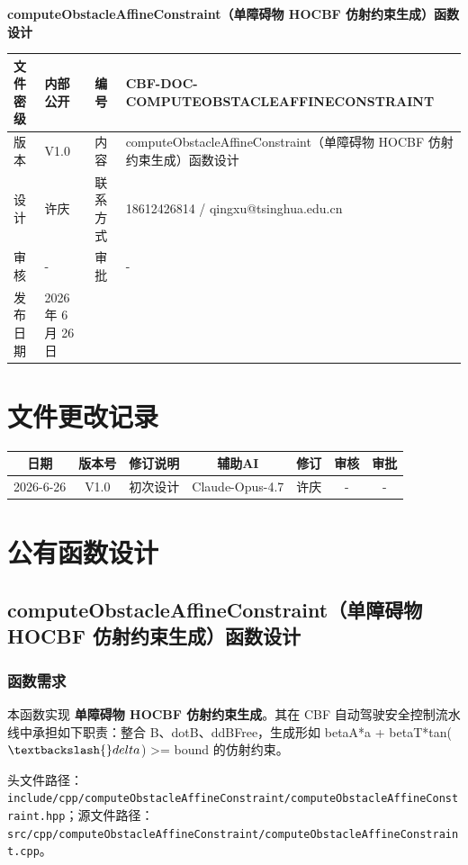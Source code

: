 \documentclass[a4paper,10pt]{article}
\begin{document}
\begin{titlepage}
    \centering
    {\Huge\textbf{computeObstacleAffineConstraint（单障碍物 HOCBF 仿射约束生成）函数设计}\par}
    \vspace{1.5cm}
    \renewcommand{\arraystretch}{1.5}
    \begin{tabular}{|l|l|l|l|}
        \hline
        文件密级 & 内部公开 & 编号 & CBF-DOC-COMPUTEOBSTACLEAFFINECONSTRAINT \\ \hline
        版本 & V1.0 & 内容 & computeObstacleAffineConstraint（单障碍物 HOCBF 仿射约束生成）函数设计 \\ \hline
        设计 & 许庆 & 联系方式 & 18612426814 / qingxu@tsinghua.edu.cn \\ \hline
        审核 & - & 审批 & - \\ \hline
        发布日期 & 2026 年 6 月 26 日 & & \\ \hline
    \end{tabular}
    \vspace{1.5cm}
    \section*{文件更改记录}
    \begin{longtable}{|c|c|p{4cm}|c|c|c|c|}
        \hline
        日期 & 版本号 & 修订说明 & 辅助AI & 修订 & 审核 & 审批 \\ \hline
        2026-6-26 & V1.0 & 初次设计 & Claude-Opus-4.7 & 许庆 & - & - \\ \hline
    \end{longtable}
\end{titlepage}
\tableofcontents
\newpage
\section{公有函数设计}
\subsection{computeObstacleAffineConstraint（单障碍物 HOCBF 仿射约束生成）函数设计}
\subsubsection{函数需求}
\par 本函数实现 \textbf{单障碍物 HOCBF 仿射约束生成}。其在 CBF 自动驾驶安全控制流水线中承担如下职责：整合 B、dotB、ddBFree，生成形如 betaA*a + betaT*tan($\textbackslash{}delta$) >= bound 的仿射约束。
\par 头文件路径：\texttt{include/cpp/computeObstacleAffineConstraint/computeObstacleAffineConstraint.hpp}；源文件路径：\texttt{src/cpp/computeObstacleAffineConstraint/computeObstacleAffineConstraint.cpp}。
\end{document}
